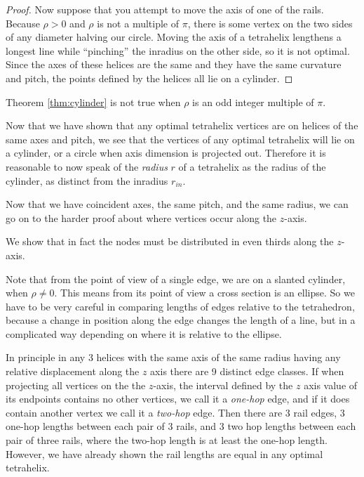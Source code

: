 \documentclass[11pt]{article}
\begin{document}
\begin{proof}
Now suppose that you attempt to move the axis of one of the rails. Because
$\rho > 0 $ and $\rho$ is not a multiple of $\pi$, there is some vertex on the two sides of any diameter
halving our circle. Moving the axis of a tetrahelix lengthens a longest line while ``pinching'' the
inradius on the other side, so it is not optimal. Since the axes of these helices are the
same and they have the same curvature and pitch, the points defined by the helices all lie
on a cylinder.


\end{proof}

Theorem \ref{thm:cylinder} is not true when $\rho$ is an odd integer multiple of $\pi$.

Now that we have shown that any optimal tetrahelix vertices
are on helices of the same axes and pitch, we see that the vertices 
of any optimal tetrahelix will lie on a cylinder, or a circle when axis dimension
is projected out. Therefore it is reasonable to now speak of the \emph{radius} $r$
of a tetrahelix as the radius of the cylinder, as distinct from the inradius $r_{in}$.

Now that we have coincident axes, the same pitch, and the same radius, we can go on to
 the harder proof about where vertices occur along the $z$-axis.

 We show that in fact the nodes must be distributed in even thirds
 along the $z$-axis.

 Note that from the point of view of a single edge, we are on a
 slanted cylinder, when $\rho \neq 0$.  This means from its point of
 view a cross section is an ellipse. So we have to be very careful in
 comparing lengths of edges relative to the tetrahedron, because a
 change in position along the edge changes the length of a line, but
 in a complicated way depending on where it is relative to the
 ellipse.

 In principle in any 3 helices with the same axis of the same radius
 having any relative
 displacement along the $z$ axis there are 9 distinct edge classes.
 If when projecting all vertices on the the $z$-axis, the interval
 defined by the $z$ axis value of its endpoints contains no other vertices,
 we call it a \emph{one-hop} edge, and if it does contain another vertex we
 call it a \emph{two-hop} edge.
 Then there are 
 3 rail edges, 3 one-hop lengths between each pair of 3 rails, and 3 two hop
 lengths between each pair of three rails, where the two-hop length is at least
 the one-hop length.
 However, we have already shown the rail
 lengths are equal in any optimal tetrahelix.
\end{document}
